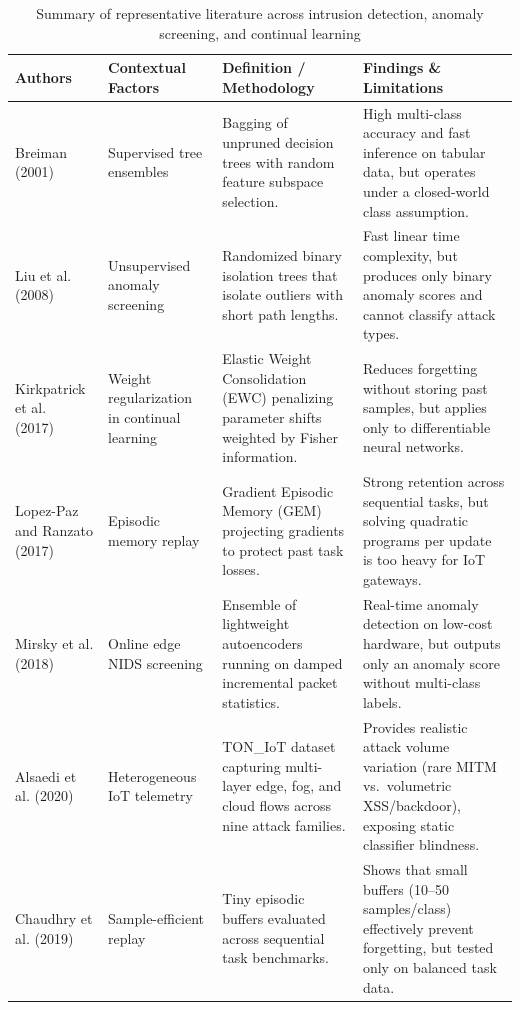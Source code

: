 \begin{table}[htpb]
\small
\renewcommand{\arraystretch}{1.4}
\caption{Summary of representative literature across intrusion detection, anomaly screening, and continual learning}
\label{tab1}
\begin{tabular}{|p{2.6cm}|p{2.6cm}|p{4.2cm}|p{4.6cm}|}
\hline
\textbf{Authors} & \textbf{Contextual Factors} & \textbf{Definition / Methodology} & \textbf{Findings \& Limitations} \\ \hline
Breiman (2001)~\cite{breiman2001random} & Supervised tree ensembles & Bagging of unpruned decision trees with random feature subspace selection. & High multi-class accuracy and fast inference on tabular data, but operates under a closed-world class assumption. \\ \hline
Liu et al. (2008)~\cite{liu2008isolation} & Unsupervised anomaly screening & Randomized binary isolation trees that isolate outliers with short path lengths. & Fast linear time complexity, but produces only binary anomaly scores and cannot classify attack types. \\ \hline
Kirkpatrick et al. (2017)~\cite{kirkpatrick2017overcoming} & Weight regularization in continual learning & Elastic Weight Consolidation (EWC) penalizing parameter shifts weighted by Fisher information. & Reduces forgetting without storing past samples, but applies only to differentiable neural networks. \\ \hline
Lopez-Paz and Ranzato (2017)~\cite{lopezpaz2017gem} & Episodic memory replay & Gradient Episodic Memory (GEM) projecting gradients to protect past task losses. & Strong retention across sequential tasks, but solving quadratic programs per update is too heavy for IoT gateways. \\ \hline
Mirsky et al. (2018)~\cite{mirsky2018kitsune} & Online edge NIDS screening & Ensemble of lightweight autoencoders running on damped incremental packet statistics. & Real-time anomaly detection on low-cost hardware, but outputs only an anomaly score without multi-class labels. \\ \hline
Alsaedi et al. (2020)~\cite{alshammari2020toniot} & Heterogeneous IoT telemetry & TON\_IoT dataset capturing multi-layer edge, fog, and cloud flows across nine attack families. & Provides realistic attack volume variation (rare MITM vs.\ volumetric XSS/backdoor), exposing static classifier blindness. \\ \hline
Chaudhry et al. (2019)~\cite{chaudhry2019tiny} & Sample-efficient replay & Tiny episodic buffers evaluated across sequential task benchmarks. & Shows that small buffers (10--50 samples/class) effectively prevent forgetting, but tested only on balanced task data. \\ \hline

\end{tabular}
\end{table}
